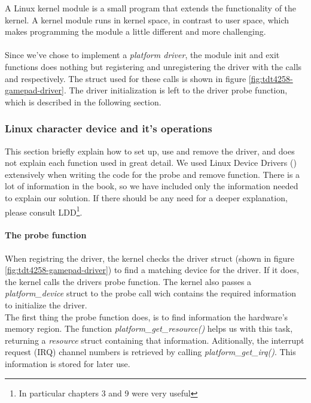 A Linux kernel module is a small program that extends the functionality of the kernel. A kernel module runs in kernel space, in contrast to user space, which makes programming the module a little different and more challenging.\\
\\
Since we've chose to implement a \emph{platform driver}, the module init and exit functions does nothing but registering and unregistering the driver with the calls  and  respectively. The struct used for these calls is shown in figure \ref{fig:tdt4258-gamepad-driver}. The driver initialization is left to the driver probe function, which is described in the following section. 

\subsubsection{Linux character device and it's operations}

This section briefly explain how to set up, use and remove the driver, and does not explain each function used in great detail. We used Linux Device Drivers (\cite{ldd}) extensively when writing the code for the probe and remove function. There is a lot of information in the book, so we have included only the information needed to explain our solution. If there should be any need for a deeper explanation, please consult LDD\footnote{In particular chapters 3 and 9 were very useful}.   

\paragraph{The probe function}
When registring the driver, the kernel checks the driver struct (shown in figure \ref{fig:tdt4258-gamepad-driver}) to find a matching device for the driver. If it does, the kernel calls the drivers probe function. The kernel also passes a \emph{platform\_device} struct to the probe call wich contains  the required information to initialize the driver.\\

The first thing the probe function does, is to find information the hardware's memory region. The function \emph{platform\_get\_resource()} helps us with this task, returning a \emph{resource} struct containing that information. Aditionally, the interrupt request (IRQ) channel numbers is retrieved by calling \emph{platform\_get\_irq()}. This information is stored for later use. \\

